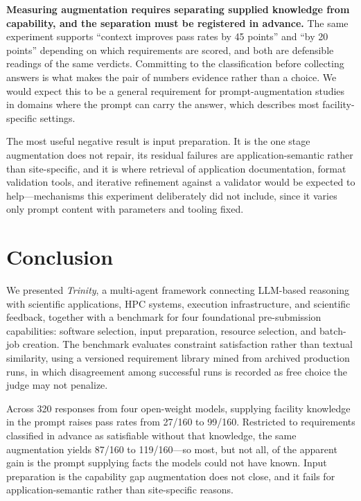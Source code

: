 \documentclass[conference]{IEEEtran}
\begin{document}
\textbf{Measuring augmentation requires separating supplied knowledge from capability, and the separation must be registered in advance.} The same experiment supports ``context improves pass rates by 45 points'' and ``by 20 points'' depending on which requirements are scored, and both are defensible readings of the same verdicts. Committing to the classification before collecting answers is what makes the pair of numbers evidence rather than a choice. We would expect this to be a general requirement for prompt-augmentation studies in domains where the prompt can carry the answer, which describes most facility-specific settings.

The most useful negative result is input preparation. It is the one stage augmentation does not repair, its residual failures are application-semantic rather than site-specific, and it is where retrieval of application documentation, format validation tools, and iterative refinement against a validator would be expected to help---mechanisms this experiment deliberately did not include, since it varies only prompt content with parameters and tooling fixed.

\section{Conclusion}\label{sec:conclusion}

We presented \textit{Trinity}, a multi-agent framework connecting LLM-based reasoning with scientific applications, HPC systems, execution infrastructure, and scientific feedback, together with a benchmark for four foundational pre-submission capabilities: software selection, input preparation, resource selection, and batch-job creation. The benchmark evaluates constraint satisfaction rather than textual similarity, using a versioned requirement library mined from archived production runs, in which disagreement among successful runs is recorded as free choice the judge may not penalize.

Across 320 responses from four open-weight models, supplying facility knowledge in the prompt raises pass rates from 27/160 to 99/160. Restricted to requirements classified in advance as satisfiable without that knowledge, the same augmentation yields 87/160 to 119/160---so most, but not all, of the apparent gain is the prompt supplying facts the models could not have known. Input preparation is the capability gap augmentation does not close, and it fails for application-semantic rather than site-specific reasons.
\end{document}
